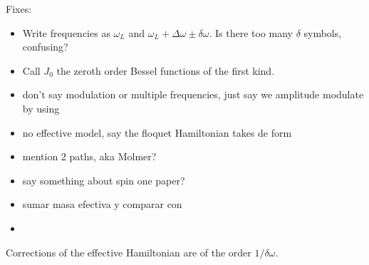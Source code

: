 Fixes:
\begin{itemize}
	\item Write frequencies as $\omega_L$ and $\omega_L +\Delta\omega \pm\delta\omega$. Is there too many $\delta$ symbols, confusing?
	\item Call $J_0$ the zeroth order Bessel functions of the first kind.
	\item don't say modulation or multiple frequencies, just say we amplitude modulate by using 
	\item no effective model, say the floquet Hamiltonian takes de form
	\item mention 2 paths, aka Molmer?
	\item say something about spin one paper?
	\item sumar masa efectiva y comparar con 
	\item 
\end{itemize}




Corrections of the effective Hamiltonian are of the order $1/\delta\omega$.
